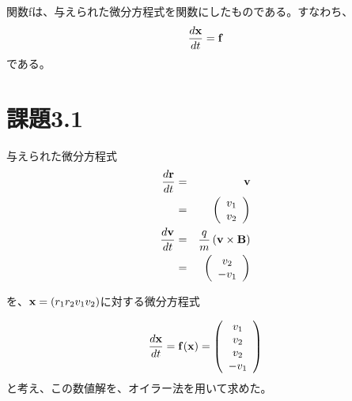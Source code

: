 \documentclass[11pt]{jsarticle}
\newcommand{\xb}{{\bf x}}
\newcommand{\fb}{{\bf f}}
\begin{document}
                関数fは、与えられた微分方程式を関数にしたものである。すなわち、
                \begin{eqnarray}
                    \frac{d{\bf x}}{dt} = {\bf f}
                \end{eqnarray}
                である。

    \section{課題3.1}
        与えられた微分方程式
        \begin{eqnarray*}
            \frac{d{\bf r}}{dt} & = & {\bf v} \\
                                & = & \left(
                                          \begin{array}{c}
                                              v_1 \\
                                              v_2
                                          \end{array}
                                      \right) \\
            \frac{d{\bf v}}{dt} & = & \frac{q}{m}\left( {\bf v} \times {\bf B} \right) \\
                                & = & \left(
                                          \begin{array}{c}
                                              v_2 \\
                                              - v_1
                                          \end{array}
                                      \right) \\
        \end{eqnarray*}

        を、$\xb = (r_1 r_2 v_1 v_2)$に対する微分方程式

        \begin{eqnarray}
            \frac{d\xb}{dt} = \fb(\xb) = \left(
                                             \begin{array}{c}
                                              v_1 \\
                                              v_2 \\
                                              v_2 \\
                                              - v_1 
                                             \end{array}
                                         \right)
            \label{eq1}
        \end{eqnarray}
        と考え、この数値解を、オイラー法を用いて求めた。
\end{document}
